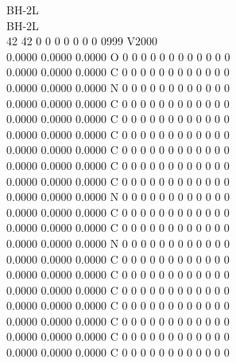 \documentclass[11pt,titlepage,dvipdfmx,twoside]{article}
\begin{document}
\begin{oframed}
{BH-2L                                                                   \\
BH-2L                                                                   \\
 42 42  0  0  0  0  0  0  0  0999 V2000                                 \\
    0.0000    0.0000    0.0000  O  0  0  0  0  0  0  0  0  0  0  0  0   \\
    0.0000    0.0000    0.0000  C  0  0  0  0  0  0  0  0  0  0  0  0   \\
    0.0000    0.0000    0.0000  N  0  0  0  0  0  0  0  0  0  0  0  0   \\
    0.0000    0.0000    0.0000  C  0  0  0  0  0  0  0  0  0  0  0  0   \\
    0.0000    0.0000    0.0000  C  0  0  0  0  0  0  0  0  0  0  0  0   \\
    0.0000    0.0000    0.0000  C  0  0  0  0  0  0  0  0  0  0  0  0   \\
    0.0000    0.0000    0.0000  C  0  0  0  0  0  0  0  0  0  0  0  0   \\
    0.0000    0.0000    0.0000  C  0  0  0  0  0  0  0  0  0  0  0  0   \\
    0.0000    0.0000    0.0000  C  0  0  0  0  0  0  0  0  0  0  0  0   \\
    0.0000    0.0000    0.0000  N  0  0  0  0  0  0  0  0  0  0  0  0   \\
    0.0000    0.0000    0.0000  C  0  0  0  0  0  0  0  0  0  0  0  0   \\
    0.0000    0.0000    0.0000  C  0  0  0  0  0  0  0  0  0  0  0  0   \\
    0.0000    0.0000    0.0000  N  0  0  0  0  0  0  0  0  0  0  0  0   \\
    0.0000    0.0000    0.0000  C  0  0  0  0  0  0  0  0  0  0  0  0   \\
    0.0000    0.0000    0.0000  C  0  0  0  0  0  0  0  0  0  0  0  0   \\
    0.0000    0.0000    0.0000  C  0  0  0  0  0  0  0  0  0  0  0  0   \\
    0.0000    0.0000    0.0000  C  0  0  0  0  0  0  0  0  0  0  0  0   \\
    0.0000    0.0000    0.0000  C  0  0  0  0  0  0  0  0  0  0  0  0   \\
    0.0000    0.0000    0.0000  C  0  0  0  0  0  0  0  0  0  0  0  0   \\
    0.0000    0.0000    0.0000  C  0  0  0  0  0  0  0  0  0  0  0  0   \\
}
\end{oframed}
\end{document}
